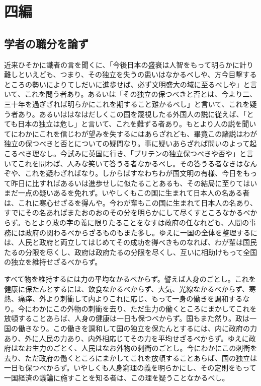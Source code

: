 \documentclass[a4paper, platex, dvipdfmx]{jsarticle}
\begin{document}
\section{四編}
\subsection{学者の職分を論ず}
近来ひそかに識者の言を聞くに、「今後日本の盛衰は人智をもって明らかに計り難しといえども、つまり、その独立を失うの患いはなかるべしや、方今目撃するところの勢いによりてしだいに進歩せば、必ず文明盛大の域に至るべしや」と言いて、これを問う者あり。あるいは「その独立の保つべきと否とは、今より二、三十年を過ぎざれば明らかにこれを期すること難かるべし」と言いて、これを疑う者あり。あるいははなはだしくこの国を蔑視したる外国人の説に従えば、「とても日本の独立は危し」と言いて、これを難ずる者あり。もとより人の説を聞いてにわかにこれを信じわが望みを失するにはあらざれども、畢竟この諸説はわが独立の保つべきと否とについての疑問なり。事に疑いあらざれば問いのよって起こるべき理なし。今試みに英国に行き、「ブリテンの独立保つべきや否や」と言いてこれを問わば、人みな笑いて答うる者なかるべし。その答うる者なきはなんぞや、これを疑わざればなり。しからばすなわちわが国文明の有様、今日をもって昨日に比すればあるいは進歩せしに似たることあるも、その結局に至りてはいまだ一点の疑いあるを免れず。いやしくもこの国に生まれて日本人の名ある者は、これに寒心せざるを得んや。今わが輩もこの国に生まれて日本人の名あり、すでにその名あればまたおのおのその分を明らかにして尽くすところなかるべからず。もとより政の字の義に限りたることをなすは政府の任なれども、人間の事務には政府の関わるべからざるものもまた多し。ゆえに一国の全体を整理するには、人民と政府と両立してはじめてその成功を得べきものなれば、わが輩は国民たるの分限を尽くし、政府は政府たるの分限を尽くし、互いに相助けもって全国の独立を維持せざるべからず。

すべて物を維持するには力の平均なかるべからず。譬えば人身のごとし。これを健康に保たんとするには、飲食なかるべからず、大気、光線なかるべからず、寒熱、痛痒、外より刺衝して内よりこれに応じ、もって一身の働きを調和するなり。今にわかにこの外物の刺衝を去り、ただ生力の働くところにまかしてこれを放頓することあらば、人身の健康は一日も保つべからず。国もまた然り。政は一国の働きなり。この働きを調和して国の独立を保たんとするには、内に政府の力あり、外に人民の力あり、内外相応じてその力を平均せざるべからず。ゆえに政府はなお生力のごとく、人民はなお外物の刺衝のごとし。今にわかにこの刺衝を去り、ただ政府の働くところにまかしてこれを放頓することあらば、国の独立は一日も保つべからず。いやしくも人身窮理の義を明らかにし、その定則をもって一国経済の議論に施すことを知る者は、この理を疑うことなかるべし。
\end{document}
